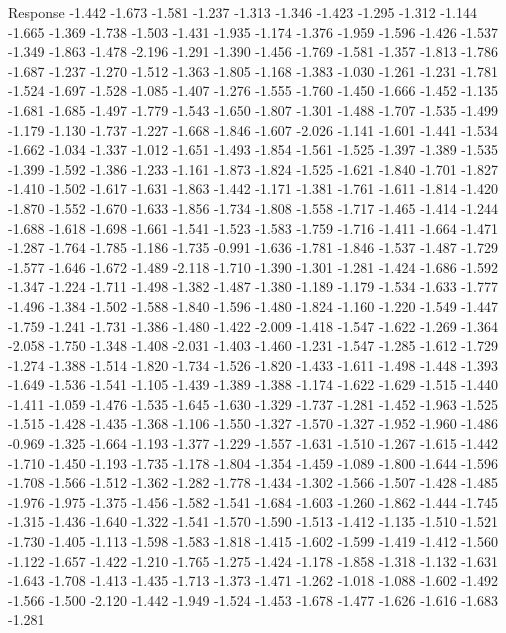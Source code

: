 \documentclass[9pt]{article}
\theoremstyle{plain}
\theoremstyle{definition}
\theoremstyle{remark}
\numberwithin{equation}{section}
\begin{document}
Response
-1.442
-1.673
-1.581
-1.237
-1.313
-1.346
-1.423
-1.295
-1.312
-1.144
-1.665
-1.369
-1.738
-1.503
-1.431
-1.935
-1.174
-1.376
-1.959
-1.596
-1.426
-1.537
-1.349
-1.863
-1.478
-2.196
-1.291
-1.390
-1.456
-1.769
-1.581
-1.357
-1.813
-1.786
-1.687
-1.237
-1.270
-1.512
-1.363
-1.805
-1.168
-1.383
-1.030
-1.261
-1.231
-1.781
-1.524
-1.697
-1.528
-1.085
-1.407
-1.276
-1.555
-1.760
-1.450
-1.666
-1.452
-1.135
-1.681
-1.685
-1.497
-1.779
-1.543
-1.650
-1.807
-1.301
-1.488
-1.707
-1.535
-1.499
-1.179
-1.130
-1.737
-1.227
-1.668
-1.846
-1.607
-2.026
-1.141
-1.601
-1.441
-1.534
-1.662
-1.034
-1.337
-1.012
-1.651
-1.493
-1.854
-1.561
-1.525
-1.397
-1.389
-1.535
-1.399
-1.592
-1.386
-1.233
-1.161
-1.873
-1.824
-1.525
-1.621
-1.840
-1.701
-1.827
-1.410
-1.502
-1.617
-1.631
-1.863
-1.442
-1.171
-1.381
-1.761
-1.611
-1.814
-1.420
-1.870
-1.552
-1.670
-1.633
-1.856
-1.734
-1.808
-1.558
-1.717
-1.465
-1.414
-1.244
-1.688
-1.618
-1.698
-1.661
-1.541
-1.523
-1.583
-1.759
-1.716
-1.411
-1.664
-1.471
-1.287
-1.764
-1.785
-1.186
-1.735
-0.991
-1.636
-1.781
-1.846
-1.537
-1.487
-1.729
-1.577
-1.646
-1.672
-1.489
-2.118
-1.710
-1.390
-1.301
-1.281
-1.424
-1.686
-1.592
-1.347
-1.224
-1.711
-1.498
-1.382
-1.487
-1.380
-1.189
-1.179
-1.534
-1.633
-1.777
-1.496
-1.384
-1.502
-1.588
-1.840
-1.596
-1.480
-1.824
-1.160
-1.220
-1.549
-1.447
-1.759
-1.241
-1.731
-1.386
-1.480
-1.422
-2.009
-1.418
-1.547
-1.622
-1.269
-1.364
-2.058
-1.750
-1.348
-1.408
-2.031
-1.403
-1.460
-1.231
-1.547
-1.285
-1.612
-1.729
-1.274
-1.388
-1.514
-1.820
-1.734
-1.526
-1.820
-1.433
-1.611
-1.498
-1.448
-1.393
-1.649
-1.536
-1.541
-1.105
-1.439
-1.389
-1.388
-1.174
-1.622
-1.629
-1.515
-1.440
-1.411
-1.059
-1.476
-1.535
-1.645
-1.630
-1.329
-1.737
-1.281
-1.452
-1.963
-1.525
-1.515
-1.428
-1.435
-1.368
-1.106
-1.550
-1.327
-1.570
-1.327
-1.952
-1.960
-1.486
-0.969
-1.325
-1.664
-1.193
-1.377
-1.229
-1.557
-1.631
-1.510
-1.267
-1.615
-1.442
-1.710
-1.450
-1.193
-1.735
-1.178
-1.804
-1.354
-1.459
-1.089
-1.800
-1.644
-1.596
-1.708
-1.566
-1.512
-1.362
-1.282
-1.778
-1.434
-1.302
-1.566
-1.507
-1.428
-1.485
-1.976
-1.975
-1.375
-1.456
-1.582
-1.541
-1.684
-1.603
-1.260
-1.862
-1.444
-1.745
-1.315
-1.436
-1.640
-1.322
-1.541
-1.570
-1.590
-1.513
-1.412
-1.135
-1.510
-1.521
-1.730
-1.405
-1.113
-1.598
-1.583
-1.818
-1.415
-1.602
-1.599
-1.419
-1.412
-1.560
-1.122
-1.657
-1.422
-1.210
-1.765
-1.275
-1.424
-1.178
-1.858
-1.318
-1.132
-1.631
-1.643
-1.708
-1.413
-1.435
-1.713
-1.373
-1.471
-1.262
-1.018
-1.088
-1.602
-1.492
-1.566
-1.500
-2.120
-1.442
-1.949
-1.524
-1.453
-1.678
-1.477
-1.626
-1.616
-1.683
-1.281
\end{document}
